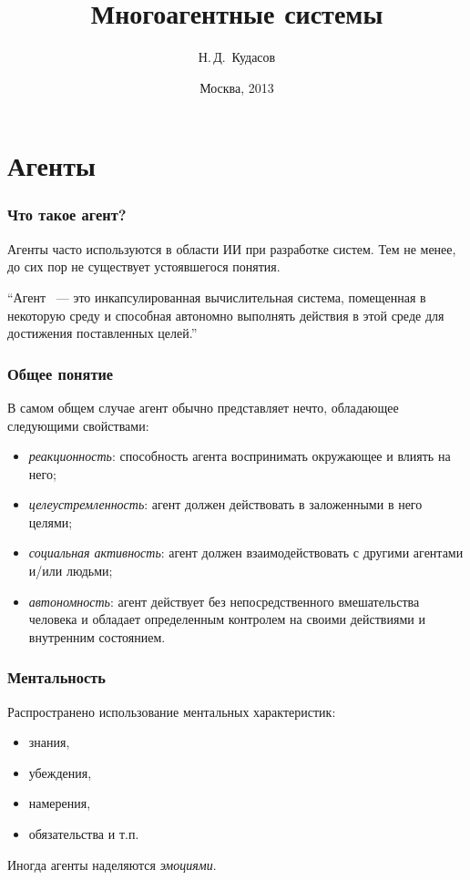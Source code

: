 \documentclass{beamer}
\begin{document}
\title[]{Многоагентные системы}
\author{Н.\,Д.~Кудасов}
\date{Москва, 2013}

\begin{frame}
\addtocounter{framenumber}{-1}
\maketitle
\end{frame}

\section{Агенты}

\begin{frame}
  \frametitle{Что такое агент?}
  Агенты часто используются в области ИИ при разработке систем.
  Тем не менее, до сих пор не существует устоявшегося понятия.

  \begin{exampleblock}{}
    {\large ``Агент ~--- это инкапсулированная вычислительная система,
    помещенная в некоторую среду и способная автономно выполнять действия
    в этой среде для достижения поставленных целей.''}
    \vskip5mm
    \hspace*{}
  \end{exampleblock}

\end{frame}

\begin{frame}
  \frametitle{Общее понятие}
  В самом общем случае агент обычно представляет нечто, обладающее
  следующими свойствами:

  \begin{itemize}
    \item<1-> {\it реакционность}: способность агента воспринимать окружающее и влиять на него;
    \item<2-> {\it целеустремленность}: агент должен действовать в заложенными в него целями;
    \item<3-> {\it социальная активность}: агент должен взаимодействовать с другими агентами и/или людьми;
    \item<4-> {\it автономность}: агент действует без непосредственного вмешательства человека и обладает
      определенным контролем на своими действиями и внутренним состоянием.
  \end{itemize}
\end{frame}

\begin{frame}
  \frametitle{Ментальность}
  Распространено использование ментальных характеристик:

  \begin{itemize}
    \item знания,
    \item убеждения,
    \item намерения,
    \item обязательства и т.п.
  \end{itemize}

  Иногда агенты наделяются {\it эмоциями}.
\end{frame}
\end{document}

